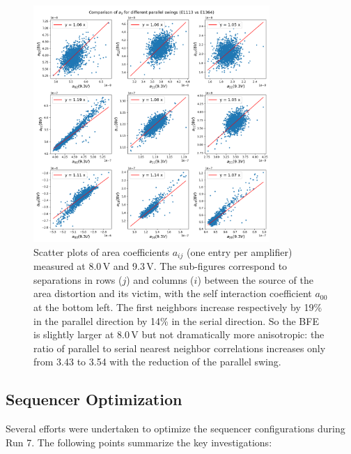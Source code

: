 \begin{figure}[ht]
\begin{centering}
\includegraphics[width=0.8\textwidth]{figures/aScatterPlots8vs9-3.png}
\end{centering}
\caption{Scatter plots of area coefficients $a_{ij}$ (one entry per amplifier)
measured at 8.0\,V and 9.3\,V. The sub-figures correspond to separations in rows ($j$) and columns ($i$)
between the source of the area distortion and its victim, with the self
interaction coefficient $a_{00}$ at the bottom left. The first neighbors increase
respectively by 19\% in the parallel direction by 14\% in the serial
direction. So the BFE is slightly larger at 8.0\,V but not dramatically
more anisotropic: the ratio of parallel to serial nearest neighbor correlations increases only from 3.43 to 3.54 with the reduction of the parallel swing.}
\label{fig:area-coeffs}
\end{figure}


\subsection{Sequencer Optimization}\label{sequencer-optimization}
Several efforts were undertaken to optimize the sequencer configurations during Run 7. The following points summarize the key investigations:

